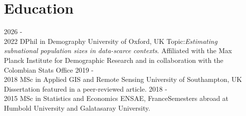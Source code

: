 \documentclass[
]{friggeri-cv}
\begin{document}
\section{Education}
\begin{entrylist}
\entry
{2026 - \\ 2022}
{DPhil in Demography}
{University of Oxford, UK}
{Topic:\textit{Estimating subnational population sizes in data-scarce contexts}. Affiliated with the Max Planck Institute for Demographic Research and in collaboration with the Colombian Stats Office}
\entry
{2019 - \\ 2018}
{MSc in Applied GIS and Remote Sensing}
{University of Southampton, UK}
{Dissertation featured in a peer-reviewed article.}
\entry
{2018 - \\ 2015}
{MSc in Statistics and Economics}
{ENSAE, France}{Semesters abroad at Humbold University and Galatasaray University.}
\end{entrylist}
\clearpage
\newpage
\end{document}
